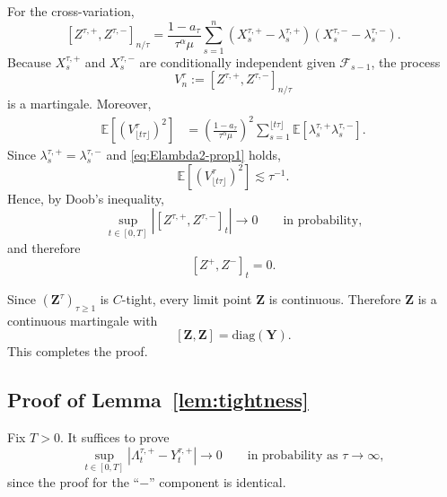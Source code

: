 \documentclass[letterpaper]{article}
\numberwithin{equation}{section}
\theoremstyle{definition}
\theoremstyle{remark}
\newcommand{\E}{\mathbb{E}}
\begin{document}
For the cross-variation,
\[
\left[Z^{\tau,+},Z^{\tau,-}\right]_{n/\tau}
  =
  \frac{1-a_\tau}{\tau^\alpha\mu}
  \sum_{s=1}^{n}
  \left(X_s^{\tau,+}-\lambda_s^{\tau,+}\right)\left(X_s^{\tau,-}-\lambda_s^{\tau,-}\right).
\]
Because $X_s^{\tau,+}$ and $X_s^{\tau,-}$ are conditionally independent given
$\mathcal F_{s-1}$, the process
\[
  V_n^\tau:=[Z^{\tau,+},Z^{\tau,-}]_{n/\tau}
\]
is a martingale. Moreover,
\begin{align*}
  \E\!\left[\left(V_{\lfloor t\tau\rfloor}^\tau\right)^2\right]
  &=
  \left(\frac{1-a_\tau}{\tau^\alpha\mu}\right)^2
  \sum_{s=1}^{\lfloor t\tau\rfloor}
  \E\!\left[
    \lambda_s^{\tau,+}\lambda_s^{\tau,-}
  \right].
\end{align*}
Since $\lambda_s^{\tau,+}=\lambda_s^{\tau,-}$ and \eqref{eq:Elambda2-prop1} holds,
\[
  \E\!\left[\left(V_{\lfloor t\tau\rfloor}^\tau\right)^2\right]
  \lesssim \tau^{-1}.
\]
Hence, by Doob's inequality,
\[
  \sup_{t\in[0,T]}|[Z^{\tau,+},Z^{\tau,-}]_t|
  \to0
  \qquad\text{in probability,}
\]
and therefore
\[
  [Z^+,Z^-]_t=0.
\]

Since $(\mathbf Z^\tau)_{\tau\ge1}$ is $C$-tight, every limit point $\mathbf Z$ is continuous.
Therefore $\mathbf Z$ is a continuous martingale with
\[
  [\mathbf Z,\mathbf Z]=\mathrm{diag}(\mathbf Y).
\]
This completes the proof.

\subsection{Proof of Lemma~\ref{lem:tightness}}\label{app:tightness}
Fix $T>0$. It suffices to prove
\[
  \sup_{t \in [0,T]} \left|\Lambda_t^{\tau,+} - Y_t^{\tau,+}\right| \to 0
  \qquad\text{in probability as }\tau\to\infty,
\]
since the proof for the ``$-$'' component is identical.
\end{document}
